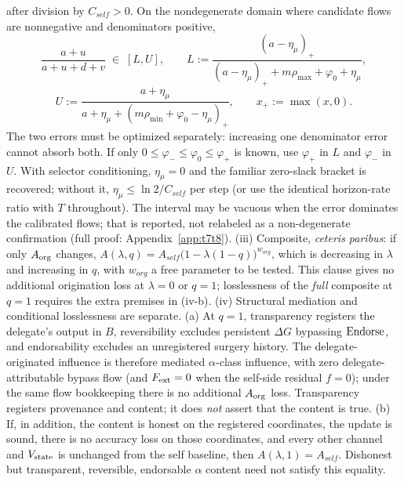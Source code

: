 \begin{theorem}
after division by $C_{self}>0$. On the nondegenerate domain where candidate
flows are nonnegative and denominators positive,
\begin{equation}\label{eq:t7-bracket}
\frac{a+u}{a+u+d+v}\;\in\;[L,U],\qquad
L:=\frac{(a-\eta_\mu)_+}{(a-\eta_\mu)_+ + m\rho_{\max}+\varphi_0+\eta_\mu},
\end{equation}
\[
U:=\frac{a+\eta_\mu}{a+\eta_\mu+(m\rho_{\min}+\varphi_0-\eta_\mu)_+},
\qquad x_+:=\max(x,0).
\]
The two errors must be optimized separately: increasing one denominator
error cannot absorb both. If only $0\le\varphi_-\le\varphi_0\le\varphi_+$
is known, use $\varphi_+$ in $L$ and $\varphi_-$ in $U$. With selector
conditioning, $\eta_\mu=0$ and the familiar zero-slack bracket is recovered;
without it, $\eta_\mu\le\ln2/C_{self}$ per step (or use the identical
horizon-rate ratio with $T$ throughout). The interval may be vacuous when
the error dominates the calibrated flows; that is reported, not relabeled as
a non-degenerate confirmation (full proof: Appendix~\ref{app:t7t8}).
\textup{(iii)} Composite, \emph{ceteris paribus}: if only $A_{\mathrm{org}}$ changes,
$A(\lambda,q)=A_{self}\bigl(1-\lambda(1-q)\bigr)^{w_{org}}$, which is
decreasing in $\lambda$ and increasing in $q$, with $w_{org}$ a free
parameter to be tested. This clause gives no additional origination loss at
$\lambda=0$ or $q=1$; losslessness of the \emph{full} composite at $q=1$
requires the extra premises in (iv-b).
\textup{(iv)} Structural mediation and conditional losslessness are
separate. \textup{(a)} At $q=1$, transparency registers the delegate's
output in $B$, reversibility excludes persistent $\Delta G$ bypassing
$\mathrm{Endorse}$, and endorsability excludes an unregistered surgery history. The
delegate-originated influence is therefore mediated $\alpha$-class
influence, with zero delegate-attributable bypass flow (and $F_{\mathrm{ext}}=0$ when
the self-side residual $f=0$); under the same flow bookkeeping there is no
additional $A_{\mathrm{org}}$ loss. Transparency registers provenance and content; it
does \emph{not} assert that the content is true. \textup{(b)} If, in
addition, the content is honest on the registered coordinates, the update
is sound, there is no accuracy loss on those coordinates, and every other
channel and $V_{\mathrm{state}}$ is unchanged from the self baseline, then
$A(\lambda,1)=A_{self}$. Dishonest but transparent, reversible, endorsable
$\alpha$ content need not satisfy this equality.
\end{theorem}
